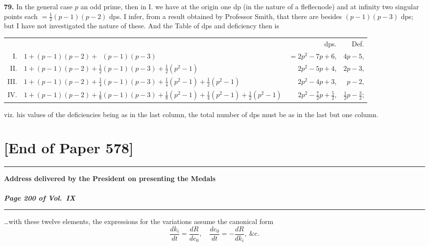 \documentclass[11pt,a4paper]{book}
\begin{document}
\textbf{79.} In the general case $p$ an odd prime, then in I. we have at the origin one dp (in the nature of a fleflecnode) and at infinity two singular points each $= \frac{1}{2}(p - 1)(p - 2)$ dps. I infer, from a result obtained by Professor Smith, that there are besides $(p - 1)(p - 3)$ dps; but I have not investigated the nature of these. And the Table of dps and deficiency then is
\begin{center}
\begin{tabular}{r@{\quad}l@{\quad}r@{\quad}r}
& & dps. & Def. \\
I. & $1 + (p-1)(p-2) + \phantom{\frac{1}{2}}(p-1)(p-3)$ &
$= 2p^2 - 7p + 6$, & $4p - 5$, \\
II. & $1 + (p-1)(p-2) + \frac{1}{2}(p-1)(p-3) + \frac{1}{2}(p^2 - 1)$ &
$2p^2 - 5p + 4$, & $2p - 3$, \\
III. & $1 + (p-1)(p-2) + \frac{1}{4}(p-1)(p-3) + \frac{1}{4}(p^2 - 1) + \frac{1}{2}(p^2 - 1)$ &
$2p^2 - 4p + 3$, & $p - 2$, \\
IV. & $1 + (p-1)(p-2) + \frac{1}{8}(p-1)(p-3) + \frac{1}{8}(p^2 - 1) + \frac{1}{4}(p^2 - 1) + \frac{1}{2}(p^2 - 1)$ &
$2p^2 - \frac{7}{2}p + \frac{5}{2}$, & $\frac{1}{2}p - \frac{3}{2}$;
\end{tabular}
\end{center}
viz. his values of the deficiencies being as in the last column, the total number of dps must be as in the last but one column.

\newpage
\section*{[End of Paper 578]}

\vspace{2em}
\noindent\rule{\textwidth}{0.4pt}




\newpage
\begin{center}
\Large\bfseries Address delivered by the President on presenting the Medals\\[0.3em]
\normalsize\mdseries [Paper 579]\\[0.3em]
\textit{Page 200 of Vol.~IX}
\end{center}

\noindent\rule{\textwidth}{0.4pt}

\medskip

\ldots with these twelve elements, the expressions for the variations assume the canonical form
\[
\frac{dk_i}{dt} = \frac{dR}{de_0}, \quad \frac{de_0}{dt} = -\frac{dR}{dk_i}, \ \&\text{c.}
\]
\end{document}
